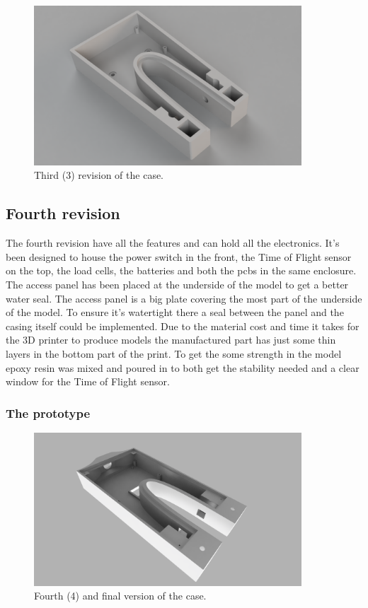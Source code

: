 
\begin{figure}[H]
\begin{center}
	\includegraphics[width = 10cm]{Figures/Case_rev_3.png}
	\caption{Third (3) revision of the case.}
	\label{Case_rev_2}
\end{center}
\end{figure}

\subsection{Fourth revision}

The fourth revision have all the features and can hold all the electronics. It's been designed to house the power switch in the front, the Time of Flight sensor on the top, the load cells, the batteries and both the \gls{pcb}s in the same enclosure. The access panel has been placed at the underside of the model to get a better water seal. The access panel is a big plate covering the most part of the underside of the model. To ensure it's watertight there a seal between the panel and the casing itself could be implemented.
Due to the material cost and time it takes for the 3D printer to produce models the manufactured part has just some thin layers in the bottom part of the print. To get the some strength in the model epoxy resin was mixed and poured in to both get the stability needed and a clear window for the Time of Flight sensor.

\subsubsection{The prototype}

\begin{figure}[H]
\begin{center}
	\includegraphics[width = 10cm]{Figures/Case_rev_4.png}
	\caption{Fourth (4) and final version of the case.}
	\label{Case_rev_4}
\end{center}
\end{figure}

